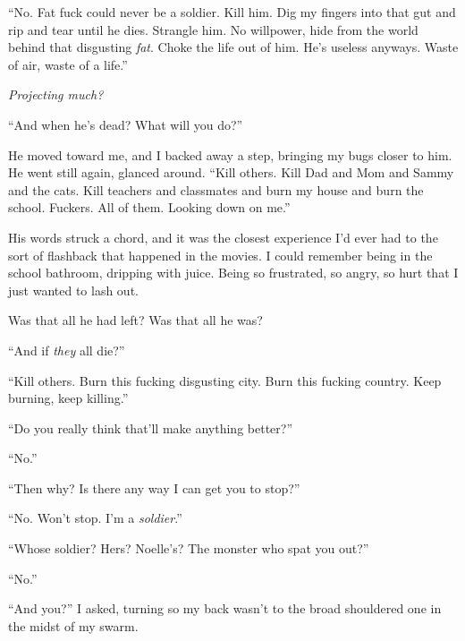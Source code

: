 ``No.  Fat fuck could never be a soldier.  Kill him.  Dig my fingers into that gut and rip and tear until he dies.  Strangle him.  No willpower, hide from the world behind that disgusting \emph{fat}.  Choke the life out of him.  He's useless anyways.  Waste of air, waste of a life.''



\emph{Projecting much?}



``And when he's dead?  What will you do?''



He moved toward me, and I backed away a step, bringing my bugs closer to him.  He went still again, glanced around.  ``Kill others.  Kill Dad and Mom and Sammy and the cats.  Kill teachers and classmates and burn my house and burn the school.  Fuckers.  All of them.  Looking down on me.''



His words struck a chord, and it was the closest experience I'd ever had to the sort of flashback that happened in the movies.  I could remember being in the school bathroom, dripping with juice.  Being so frustrated, so angry, so hurt that I just wanted to lash out.



Was that all he had left?  Was that all he was?



``And if \emph{they} all die?''



``Kill others.  Burn this fucking disgusting city.  Burn this fucking country.  Keep burning, keep killing.''



``Do you really think that'll make anything better?''



``No.''



``Then why?  Is there any way I can get you to stop?''



``No.  Won't stop.  I'm a \emph{soldier}.''



``Whose soldier?  Hers? Noelle's?  The monster who spat you out?''



``No.''



``And you?'' I asked, turning so my back wasn't to the broad shouldered one in the midst of my swarm.



